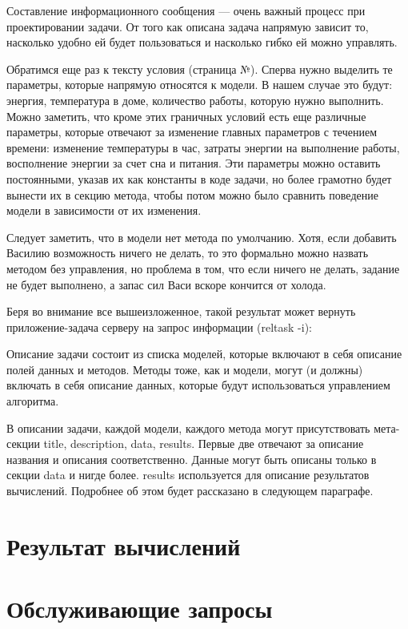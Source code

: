 Составление информационного сообщения — очень важный процесс при проектировании задачи. От того как описана задача напрямую зависит то, насколько удобно ей будет пользоваться и насколько гибко ей можно управлять.

Обратимся еще раз к тексту условия (страница №). Сперва нужно выделить те параметры, которые напрямую относятся к модели. В нашем случае это будут: энергия, температура в доме, количество работы, которую нужно выполнить. Можно заметить, что кроме этих граничных условий есть еще различные параметры, которые отвечают за изменение главных параметров с течением времени: изменение температуры в час, затраты энергии на выполнение работы, восполнение энергии за счет сна и питания. 
Эти параметры можно оставить постоянными, указав их как константы в коде задачи, но более грамотно будет вынести их в секцию метода, чтобы потом можно было сравнить поведение модели в зависимости от их изменения.

Следует заметить, что в модели нет метода по умолчанию. Хотя, если добавить Василию возможность ничего не делать, то это формально можно назвать методом без управления, но проблема в том, что если ничего не делать, задание не будет выполнено, а запас сил Васи вскоре кончится от холода.

Беря во внимание все вышеизложенное, такой результат может вернуть приложение-задача серверу на запрос информации (reltask -i):



Описание задачи состоит из списка моделей, которые включают в себя описание полей данных и методов. Методы тоже, как и модели, могут (и должны) включать в себя описание данных, которые будут использоваться управлением алгоритма.

В описании задачи, каждой модели, каждого метода могут присутствовать мета-секции title, description, data, results. Первые две отвечают за описание названия и описания соответственно. Данные могут быть описаны только в секции data и нигде более. results используется для описание результатов вычислений. Подробнее об этом будет рассказано в следующем параграфе.

\section{Результат вычислений}

\section{Обслуживающие запросы}
